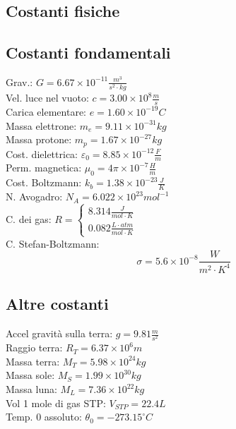 \documentclass{article}
\begin{document}
\begin{small}
\begin{multicols}{3}
\section{Costanti fisiche}
	\subsection{Costanti fondamentali}
		Grav.: $ G = 6.67 \times 10^{-11} \frac{ m^3 }{ s^2 \cdot kg } $ \\
		Vel. luce nel vuoto: $ c = 3.00 \times 10^{8} \frac{ m }{ s } $ \\
		Carica elementare: $ e = 1.60 \times 10^{-19} C $ \\
		Massa elettrone: $ m_e = 9.11 \times 10^{-31} kg $ \\
		Massa protone: $ m_p = 1.67 \times 10^{-27} kg $ \\
		Cost. dielettrica: $ \varepsilon_0 = 8.85 \times 10^{-12} \frac{ F }{ m } $ \\
		Perm. magnetica: $ \mu_0 = 4 \pi \times 10^{-7} \frac{ H }{ m } $ \\
		Cost. Boltzmann: $ k_b = 1.38 \times 10^{-23} \frac{ J }{ K } $ \\
		N. Avogadro: $ N_A = 6.022 \times 10^{23} mol^{-1} $ \\
		C. dei gas: $ R = \begin{cases} 8.314 \frac{ J }{ mol \cdot K } \\ 0.082 \frac{ L \cdot atm }{ mol \cdot K } \end{cases} $ \\
		C. Stefan-Boltzmann: \[ \sigma = 5.6 \times 10^{-8} \frac{ W }{ m^2 \cdot K^4 } \]
	\subsection{Altre costanti}
		Accel gravità sulla terra: $ g = 9.81 \frac{ m }{ s^2 } $ \\
		Raggio terra: $ R_T = 6.37 \times 10^{6} m $ \\
		Massa terra: $ M_T = 5.98 \times 10^{24} kg $ \\
		Massa sole: $ M_S = 1.99 \times 10^{30} kg $ \\
		Massa luna: $ M_L = 7.36 \times 10^{22} kg $ \\
		Vol 1 mole di gas STP: $ V_{STP} = 22.4 L $ \\
		Temp. 0 assoluto: $ \theta_0 = -273.15 ^{\circ} C $

\end{multicols}
\end{small}
\end{document}
